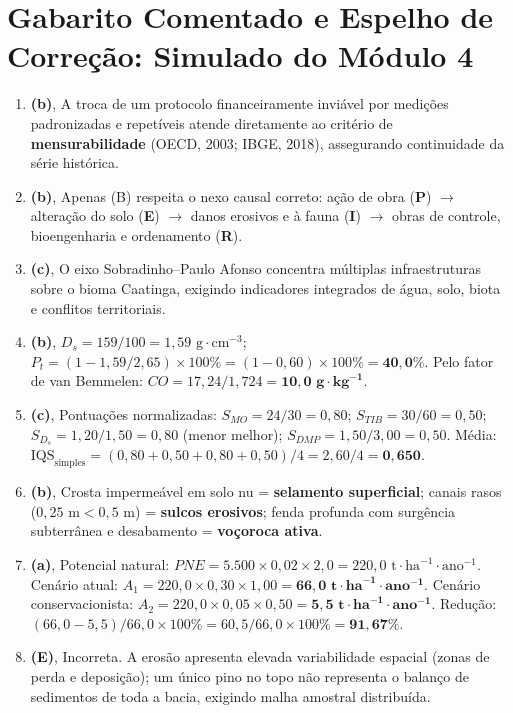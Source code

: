 \clearpage
\section*{Gabarito Comentado e Espelho de Correção: Simulado do Módulo 4}

\begin{boxGabarito}
\begin{enumerate}[leftmargin=1.6em, itemsep=4pt]
  \item \textbf{(b)}, A troca de um protocolo financeiramente inviável por medições padronizadas e repetíveis atende diretamente ao critério de \textbf{mensurabilidade} (OECD, 2003; IBGE, 2018), assegurando continuidade da série histórica.
  \item \textbf{(b)}, Apenas (B) respeita o nexo causal correto: ação de obra (\textbf{P}) $\rightarrow$ alteração do solo (\textbf{E}) $\rightarrow$ danos erosivos e à fauna (\textbf{I}) $\rightarrow$ obras de controle, bioengenharia e ordenamento (\textbf{R}).
  \item \textbf{(c)}, O eixo Sobradinho--Paulo Afonso concentra múltiplas infraestruturas sobre o bioma Caatinga, exigindo indicadores integrados de água, solo, biota e conflitos territoriais.
  \item \textbf{(b)}, $D_s = 159 / 100 = 1{,}59\text{ g}\cdot\text{cm}^{-3}$; $P_t = (1 - 1{,}59 / 2{,}65)\times 100\% = (1 - 0{,}60)\times 100\% = \mathbf{40{,}0\%}$. Pelo fator de van Bemmelen: $CO = 17{,}24 / 1{,}724 = \mathbf{10{,}0\text{ g}\cdot\text{kg}^{-1}}$.
  \item \textbf{(c)}, Pontuações normalizadas: $S_{MO} = 24/30 = 0{,}80$; $S_{TIB} = 30/60 = 0{,}50$; $S_{D_s} = 1{,}20/1{,}50 = 0{,}80$ (menor melhor); $S_{DMP} = 1{,}50/3{,}00 = 0{,}50$. Média: $\text{IQS}_{\text{simples}} = (0{,}80 + 0{,}50 + 0{,}80 + 0{,}50)/4 = 2{,}60 / 4 = \mathbf{0{,}650}$.
  \item \textbf{(b)}, Crosta impermeável em solo nu = \textbf{selamento superficial}; canais rasos ($0{,}25\text{ m} < 0{,}5\text{ m}$) = \textbf{sulcos erosivos}; fenda profunda com surgência subterrânea e desabamento = \textbf{voçoroca ativa}.
  \item \textbf{(a)}, Potencial natural: $PNE = 5.500 \times 0{,}02 \times 2{,}0 = 220{,}0\text{ t}\cdot\text{ha}^{-1}\cdot\text{ano}^{-1}$. Cenário atual: $A_1 = 220{,}0 \times 0{,}30 \times 1{,}00 = \mathbf{66{,}0\text{ t}\cdot\text{ha}^{-1}\cdot\text{ano}^{-1}}$. Cenário conservacionista: $A_2 = 220{,}0 \times 0{,}05 \times 0{,}50 = \mathbf{5{,}5\text{ t}\cdot\text{ha}^{-1}\cdot\text{ano}^{-1}}$. Redução: $(66{,}0 - 5{,}5)/66{,}0 \times 100\% = 60{,}5/66{,}0 \times 100\% = \mathbf{91{,}67\%}$.
  \item \textbf{(E)}, Incorreta. A erosão apresenta elevada variabilidade espacial (zonas de perda e deposição); um único pino no topo não representa o balanço de sedimentos de toda a bacia, exigindo malha amostral distribuída.
\end{enumerate}
\end{boxGabarito}

